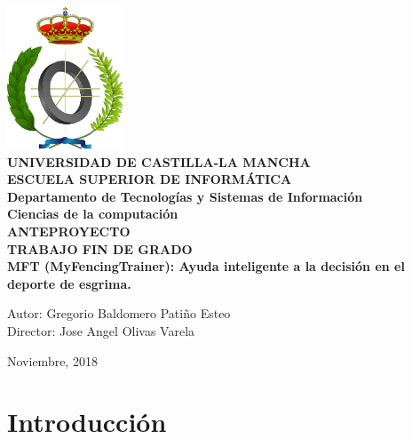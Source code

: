 \documentclass[11pt,a4paper,twoside,final]{article}
\begin{document}


\begin{titlepage}
	\begin{center}
	\includegraphics[width=3.5cm]{escudoInf}\\[1.5cm]

	{\LARGE \textbf{UNIVERSIDAD DE CASTILLA-LA MANCHA \\[0.5em]
	ESCUELA SUPERIOR DE INFORMÁTICA}}\\[0.5cm]
	{\Large \textbf{Departamento de Tecnologías y Sistemas de Información}}\\[0.5cm]
	{\large \textbf{Ciencias de la computación}}\\[1.5cm]
	{\LARGE \textbf{ANTEPROYECTO \\[0.5em]
	TRABAJO FIN DE GRADO}}\\[1cm]

	{\LARGE \textbf{MFT (MyFencingTrainer): Ayuda inteligente a la decisión en el deporte de esgrima.}}\\[3cm]
	\end{center}

	\begin{flushleft}
		{\Large Autor: Gregorio Baldomero Patiño Esteo} \\[1em]
		{\Large Director: Jose Angel Olivas Varela} \\[1em]
	\end{flushleft}
	\vfill%

	\begin{flushright}
		{\Large Noviembre, 2018}
	\end{flushright}
\end{titlepage}


\tableofcontents  %

\renewcommand{\tablename}{Tabla} %

\newpage

\section{Introducción}
\end{document}
